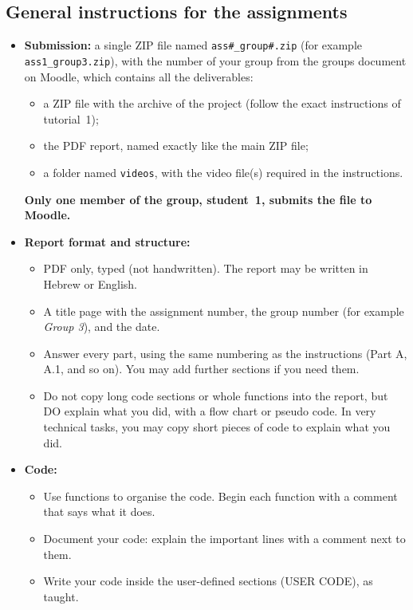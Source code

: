 \documentclass[11pt,a4paper]{article}
\begin{document}
\subsection{General instructions for the assignments}
\begin{itemize}
  \item \textbf{Submission:} a single ZIP file named \texttt{ass\#\_group\#.zip} (for example \texttt{ass1\_group3.zip}),
        with the number of your group from the groups document on Moodle, which contains all the deliverables:
  \begin{itemize}[label=$\circ$]
    \item a ZIP file with the archive of the project (follow the exact instructions of tutorial~1);
    \item the PDF report, named exactly like the main ZIP file;
    \item a folder named \texttt{videos}, with the video file(s) required in the instructions.
  \end{itemize}
  {\large\bfseries Only one member of the group, student~1, submits the file to Moodle.}
  \item \textbf{Report format and structure:}
  \begin{itemize}[label=$\circ$]
    \item PDF only, typed (not handwritten). The report may be written in Hebrew or English.
    \item A title page with the assignment number, the group number (for example \emph{Group 3}), and the date.          
    \item Answer every part, using the same numbering as the instructions (Part A, A.1, and so on). You may add further
          sections if you need them.
    \item Do not copy long code sections or whole functions into the report, but DO explain what you did, with
          a flow chart or pseudo code. In very technical tasks, you may copy short pieces of code to explain what you did.
  \end{itemize}
  \item \textbf{Code:}
  \begin{itemize}[label=$\circ$]
    \item Use functions to organise the code. Begin each function with a comment that says what it does.
    \item Document your code: explain the important lines with a comment next to them.
    \item Write your code inside the user-defined sections (USER CODE), as taught.

\end{itemize}
\end{itemize}
\end{document}
